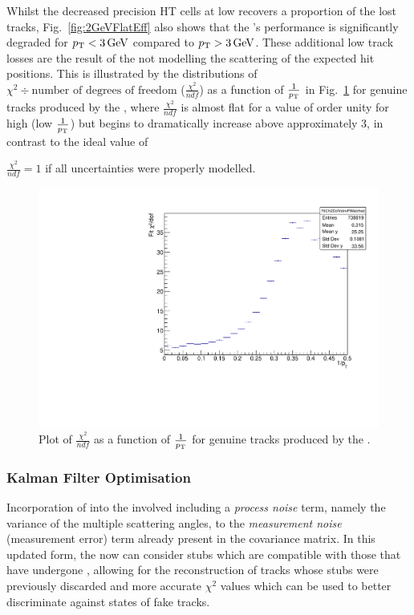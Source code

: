 Whilst the decreased precision HT cells at low \pT recovers a proportion of the lost tracks, Fig.~\ref{fig:2GeVFlatEff}  also shows that the \KF's performance is significantly degraded for $p_{\mathrm{T}} < 3 \,\text{Ge\hspace{-.08em}V}$ compared to $p_{\mathrm{T}} > 3 \,\text{Ge\hspace{-.08em}V}$.
These additional low \pT track losses are the result of the \KF not modelling the scattering of the expected hit positions.
This is illustrated by the distributions of $\chi^{2} \div \text{number of degrees of freedom}$ ($\frac{\chi^{2}}{ndf}$) as a function of $\frac{1}{p_{\mathrm{T}}}$ in Fig.~\ref{fig:2GeVFlatChi2Ndf} for genuine tracks produced by the \KF, where $\frac{\chi^{2}}{ndf}$ is almost flat for a value of order unity for high \pT (low $\frac{1}{p_{\mathrm{T}}}$) but begins to dramatically increase above approximately 3\GeV, in contrast to the ideal value of {$\frac{\chi^{2}}{ndf} = 1$ if all uncertainties were properly modelled.

\begin{figure}[tbp]
\centering
\includegraphics[width=\textwidth]{figs/tk-upgrade/results-lowPtTracking/kfChi2NdfVsInvPtFlatGeometry_5000.pdf}
\caption{Plot of $\frac{\chi^{2}}{ndf}$ as a function of $\frac{1}{p_{\mathrm{T}}}$ for genuine tracks produced by the \KF.}
\label{fig:2GeVFlatChi2Ndf}
\end{figure}

\subsubsection{Kalman Filter Optimisation}
Incorporation of \MS into the \KF involved including a \emph{process noise} term, namely the variance of the multiple scattering angles, to the \emph{measurement noise} (\ie measurement error) term already present in the \KF covariance matrix.
In this updated form, the \KF now can consider stubs which are compatible with those that have undergone \MS, allowing for the reconstruction of tracks whose stubs were previously discarded and more accurate $\chi^{2}$ values which can be used to better discriminate against states of fake tracks.

}
